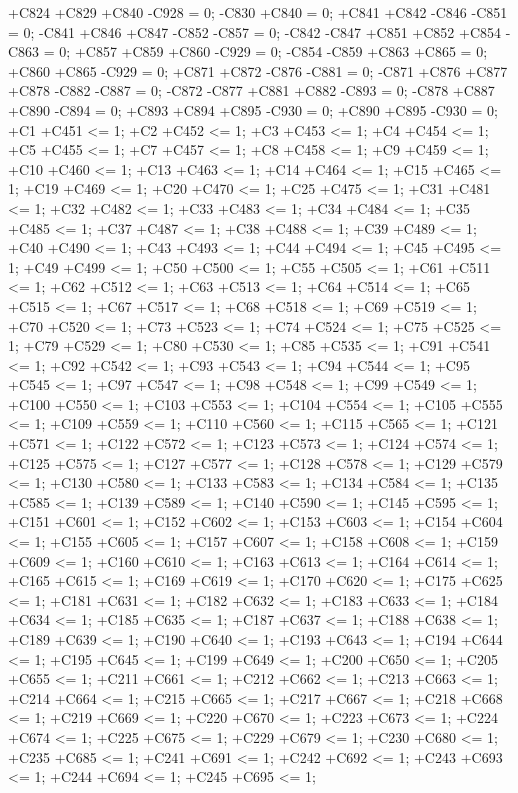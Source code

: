 +C824 +C829 +C840 -C928 = 0;
-C830 +C840 = 0;
+C841 +C842 -C846 -C851 = 0;
-C841 +C846 +C847 -C852 -C857 = 0;
-C842 -C847 +C851 +C852 +C854 -C863 = 0;
+C857 +C859 +C860 -C929 = 0;
-C854 -C859 +C863 +C865 = 0;
+C860 +C865 -C929 = 0;
+C871 +C872 -C876 -C881 = 0;
-C871 +C876 +C877 +C878 -C882 -C887 = 0;
-C872 -C877 +C881 +C882 -C893 = 0;
-C878 +C887 +C890 -C894 = 0;
+C893 +C894 +C895 -C930 = 0;
+C890 +C895 -C930 = 0;
+C1 +C451 <= 1;
+C2 +C452 <= 1;
+C3 +C453 <= 1;
+C4 +C454 <= 1;
+C5 +C455 <= 1;
+C7 +C457 <= 1;
+C8 +C458 <= 1;
+C9 +C459 <= 1;
+C10 +C460 <= 1;
+C13 +C463 <= 1;
+C14 +C464 <= 1;
+C15 +C465 <= 1;
+C19 +C469 <= 1;
+C20 +C470 <= 1;
+C25 +C475 <= 1;
+C31 +C481 <= 1;
+C32 +C482 <= 1;
+C33 +C483 <= 1;
+C34 +C484 <= 1;
+C35 +C485 <= 1;
+C37 +C487 <= 1;
+C38 +C488 <= 1;
+C39 +C489 <= 1;
+C40 +C490 <= 1;
+C43 +C493 <= 1;
+C44 +C494 <= 1;
+C45 +C495 <= 1;
+C49 +C499 <= 1;
+C50 +C500 <= 1;
+C55 +C505 <= 1;
+C61 +C511 <= 1;
+C62 +C512 <= 1;
+C63 +C513 <= 1;
+C64 +C514 <= 1;
+C65 +C515 <= 1;
+C67 +C517 <= 1;
+C68 +C518 <= 1;
+C69 +C519 <= 1;
+C70 +C520 <= 1;
+C73 +C523 <= 1;
+C74 +C524 <= 1;
+C75 +C525 <= 1;
+C79 +C529 <= 1;
+C80 +C530 <= 1;
+C85 +C535 <= 1;
+C91 +C541 <= 1;
+C92 +C542 <= 1;
+C93 +C543 <= 1;
+C94 +C544 <= 1;
+C95 +C545 <= 1;
+C97 +C547 <= 1;
+C98 +C548 <= 1;
+C99 +C549 <= 1;
+C100 +C550 <= 1;
+C103 +C553 <= 1;
+C104 +C554 <= 1;
+C105 +C555 <= 1;
+C109 +C559 <= 1;
+C110 +C560 <= 1;
+C115 +C565 <= 1;
+C121 +C571 <= 1;
+C122 +C572 <= 1;
+C123 +C573 <= 1;
+C124 +C574 <= 1;
+C125 +C575 <= 1;
+C127 +C577 <= 1;
+C128 +C578 <= 1;
+C129 +C579 <= 1;
+C130 +C580 <= 1;
+C133 +C583 <= 1;
+C134 +C584 <= 1;
+C135 +C585 <= 1;
+C139 +C589 <= 1;
+C140 +C590 <= 1;
+C145 +C595 <= 1;
+C151 +C601 <= 1;
+C152 +C602 <= 1;
+C153 +C603 <= 1;
+C154 +C604 <= 1;
+C155 +C605 <= 1;
+C157 +C607 <= 1;
+C158 +C608 <= 1;
+C159 +C609 <= 1;
+C160 +C610 <= 1;
+C163 +C613 <= 1;
+C164 +C614 <= 1;
+C165 +C615 <= 1;
+C169 +C619 <= 1;
+C170 +C620 <= 1;
+C175 +C625 <= 1;
+C181 +C631 <= 1;
+C182 +C632 <= 1;
+C183 +C633 <= 1;
+C184 +C634 <= 1;
+C185 +C635 <= 1;
+C187 +C637 <= 1;
+C188 +C638 <= 1;
+C189 +C639 <= 1;
+C190 +C640 <= 1;
+C193 +C643 <= 1;
+C194 +C644 <= 1;
+C195 +C645 <= 1;
+C199 +C649 <= 1;
+C200 +C650 <= 1;
+C205 +C655 <= 1;
+C211 +C661 <= 1;
+C212 +C662 <= 1;
+C213 +C663 <= 1;
+C214 +C664 <= 1;
+C215 +C665 <= 1;
+C217 +C667 <= 1;
+C218 +C668 <= 1;
+C219 +C669 <= 1;
+C220 +C670 <= 1;
+C223 +C673 <= 1;
+C224 +C674 <= 1;
+C225 +C675 <= 1;
+C229 +C679 <= 1;
+C230 +C680 <= 1;
+C235 +C685 <= 1;
+C241 +C691 <= 1;
+C242 +C692 <= 1;
+C243 +C693 <= 1;
+C244 +C694 <= 1;
+C245 +C695 <= 1;
